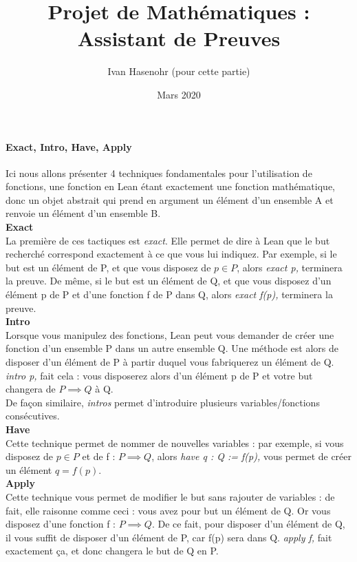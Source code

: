 \documentclass[french,frenchkw]{article}
\title{Projet de Mathématiques : Assistant de Preuves}
\author{Ivan Hasenohr (pour cette partie)}
\date{Mars 2020}
\begin{document}
\maketitle
\paragraph{Exact, Intro, Have, Apply}
Ici nous allons présenter 4 techniques fondamentales pour l'utilisation de fonctions, une fonction en Lean étant exactement une fonction mathématique, donc un objet abstrait qui prend en argument un élément d'un ensemble A et renvoie un élément d'un ensemble B.\\
\textbf{Exact}\\
La première de ces tactiques est \textit{exact}. Elle permet de dire à Lean que le but recherché correspond exactement à ce que vous lui indiquez. Par exemple, si le but est un élément de P, et que vous disposez de $p \in P$, alors \textit{exact p,} terminera la preuve. De même, si le but est un élément de Q, et que vous disposez d'un élément p de P et d'une fonction f de P dans Q, alors \textit{exact f(p),} terminera la preuve.\\
\textbf{Intro} \\
Lorsque vous manipulez des fonctions, Lean peut vous demander de créer une fonction d'un ensemble P dans un autre ensemble Q. Une méthode est alors de disposer d'un élément de P à partir duquel vous fabriquerez un élément de Q. \textit{intro p,} fait cela : vous disposerez alors d'un élément p de P et votre but changera de $P \implies Q$ à Q. \\
De façon similaire, \textit{intros} permet d'introduire plusieurs variables/fonctions consécutives.\\
\textbf{Have} \\
Cette technique permet de nommer de nouvelles variables : par exemple, si vous disposez de $p \in P$ et de f : $P \implies Q$, alors \textit{have q : Q := f(p),} vous permet de créer un élément $q = f(p)$.\\
\textbf{Apply}\\
Cette technique vous permet de modifier le but sans rajouter de variables : de fait, elle raisonne comme ceci : vous avez pour but un élément de Q. Or vous disposez d'une fonction f : $P \implies Q$. De ce fait, pour disposer d'un élément de Q, il vous suffit de disposer d'un élément de P, car f(p) sera dans Q. \textit{apply f,} fait exactement ça, et donc changera le but de Q en P.\\
\end{document}
